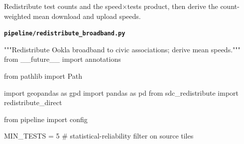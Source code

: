 \documentclass[
  letterpaper,
  DIV=11,
  numbers=noendperiod]{scrreprt}
\newenvironment{Shaded}{\begin{snugshade}}{\end{snugshade}}
\newcommand{\CommentTok}[1]{\textcolor[rgb]{0.37,0.37,0.37}{#1}}
\newcommand{\DecValTok}[1]{\textcolor[rgb]{0.68,0.00,0.00}{#1}}
\newcommand{\ImportTok}[1]{\textcolor[rgb]{0.00,0.46,0.62}{#1}}
\newcommand{\NormalTok}[1]{\textcolor[rgb]{0.00,0.23,0.31}{#1}}
\newcommand{\OperatorTok}[1]{\textcolor[rgb]{0.37,0.37,0.37}{#1}}
\begin{document}
Redistribute test counts and the speed×tests product, then derive the
count-weighted mean download and upload speeds.

\textbf{\texttt{pipeline/redistribute\_broadband.py}}

\begin{Shaded}
\begin{Highlighting}[]
\CommentTok{"""Redistribute Ookla broadband to civic associations; derive mean speeds."""}
\ImportTok{from}\NormalTok{ \_\_future\_\_ }\ImportTok{import}\NormalTok{ annotations}

\ImportTok{from}\NormalTok{ pathlib }\ImportTok{import}\NormalTok{ Path}

\ImportTok{import}\NormalTok{ geopandas }\ImportTok{as}\NormalTok{ gpd}
\ImportTok{import}\NormalTok{ pandas }\ImportTok{as}\NormalTok{ pd}
\ImportTok{from}\NormalTok{ sdc\_redistribute }\ImportTok{import}\NormalTok{ redistribute\_direct}

\ImportTok{from}\NormalTok{ pipeline }\ImportTok{import}\NormalTok{ config}

\NormalTok{MIN\_TESTS }\OperatorTok{=} \DecValTok{5}  \CommentTok{\# statistical{-}reliability filter on source tiles}



\end{Highlighting}
\end{Shaded}
\end{document}
